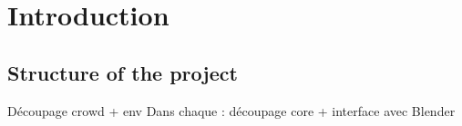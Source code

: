 \section{Introduction}



\subsection{Structure of the project}

Découpage crowd + env
Dans chaque : découpage core + interface avec Blender